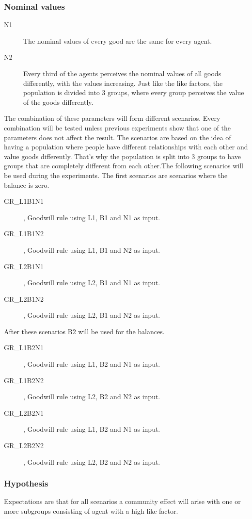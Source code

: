 \documentclass[twoside,openright]{uva-bachelor-thesis}
\begin{document}
\subsubsection{Nominal values}
\begin{description}
\item[N1]	The nominal values of every good are the same for every agent.
\item[N2]	Every third of the agents perceives the nominal values of all goods differently, with the values increasing. Just like the like factors, the population is divided into 3 groups, where every group perceives the value of the goods differently.
\end{description}
The combination of these parameters will form different scenarios. Every combination will be tested unless previous experiments show that one of the parameters does not affect the result. The scenarios are based on the idea of having a population where people have different relationships with each other and value goods differently. That’s why the population is split into 3 groups to have groups that are completely different from each other.The following scenarios will be used during the experiments.
The first scenarios are scenarios where the balance is zero.
\begin{description}
\item[GR\_L1B1N1], Goodwill rule using L1, B1 and N1 as input.
\item[GR\_L1B1N2], Goodwill rule using L1, B1 and N2 as input.
\item[GR\_L2B1N1], Goodwill rule using L2, B1 and N1 as input.
\item[GR\_L2B1N2], Goodwill rule using L2, B1 and N2 as input.
\end{description}
After these scenarios B2 will be used for the balances.
\begin{description}
\item[GR\_L1B2N1], Goodwill rule using L1, B2 and N1 as input.
\item[GR\_L1B2N2], Goodwill rule using L2, B2 and N2 as input.
\item[GR\_L2B2N1], Goodwill rule using L1, B2 and N1 as input.
\item[GR\_L2B2N2], Goodwill rule using L2, B2 and N2 as input.
\end{description}

\subsubsection{Hypothesis}
Expectations are that for all scenarios a community effect will arise with one or more subgroups consisting of agent with a high like factor. 
\end{document}
